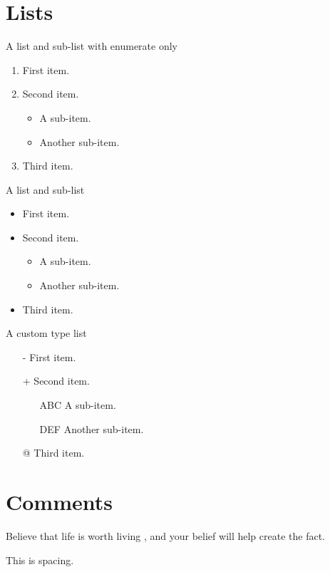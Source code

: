 \documentclass[a4paper,12pt]{report}
\begin{document}
\section{Lists}
A list and sub-list with enumerate only \\
\begin{enumerate}
\item First item.
\item Second item.
\begin{itemize}
\item A sub-item.
\item Another sub-item.
\end{itemize}
\item Third item.
\end{enumerate}

A list and sub-list \\
\begin{itemize}
\item First item.
\item Second item.
\begin{itemize}
\item A sub-item.
\item Another sub-item.
\end{itemize}
\item Third item.
\end{itemize}

A custom type list\\
\begin{itemize}
\item[-] First item.
\item[+] Second item.
\begin{itemize}
\item[ABC] A sub-item.
\item[DEF] Another sub-item.
\end{itemize}
\item[@] Third item.
\end{itemize}

\section{Comments}
Believe that life is worth living %
, and your belief will help create the fact.


\vspace{12pt}
\vspace{12pt}
\vspace{12pt}
\vspace{12pt}
\vspace{12pt}
This is spacing.
\end{document}
